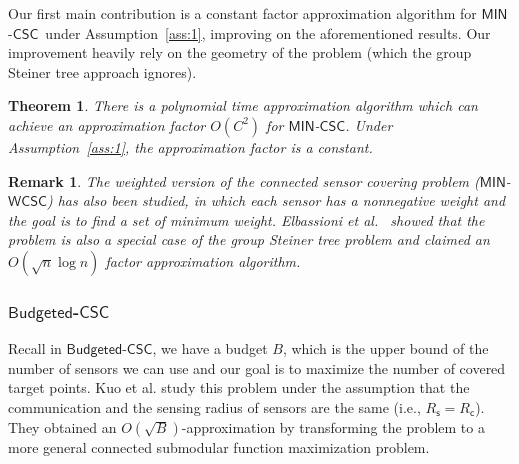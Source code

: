 \documentclass[11pt]{article}
\newcommand{\mincsc}{$\mathsf{MIN}$-$\mathsf{CSC}$}
\newcommand{\minwcsc}{$\mathsf{MIN}$-$\mathsf{WCSC}$}
\newcommand{\bcsc}{$\mathsf{Budgeted}$-$\mathsf{CSC}$}
\newcommand{\Rc}{R_\mathsf{c}}
\newcommand{\Rs}{R_\mathsf{s}}
\newtheorem{theorem}{Theorem}
\newtheorem{remark}{Remark}
\begin{document}
Our first main contribution is a constant factor approximation algorithm for
\mincsc\ under Assumption~\ref{ass:1}, improving on the aforementioned results.
Our improvement heavily rely on the geometry of the problem (which the group Steiner tree approach ignores).


\begin{theorem}
	There is a polynomial time approximation algorithm which can achieve
	an approximation factor $O(C^2)$ for \mincsc.
	Under Assumption~\ref{ass:1}, the approximation factor is a constant.
\end{theorem}

\begin{remark}
	The weighted version of the connected sensor covering problem (\minwcsc) has also been studied, in which each sensor has a nonnegative weight and the goal is to find a set of minimum weight. 
Elbassioni et al.~\cite{elbassioni2012relation} showed that the problem is also a special case of the group Steiner tree problem and claimed an $O(\sqrt{n} \log n)$ factor approximation algorithm.
\end{remark}

\vspace{-0.3cm}
\subsubsection{\bcsc}
Recall in \bcsc, we have a budget $B$, which is the upper bound of the number of sensors we can use and our goal is to maximize the number of covered target points.
Kuo et al.\cite{kuo2013maximizing} study this problem
under the assumption that the communication and the sensing radius of sensors are the same
(i.e., $\Rs=\Rc$). They obtained an $O(\sqrt{B})$-approximation by transforming the problem to a more general connected submodular function maximization problem.
\end{document}
